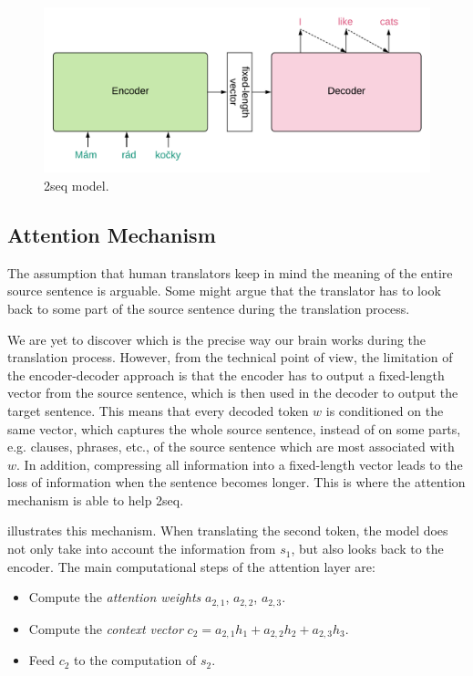 \begin{figure}
    \includegraphics[width=\linewidth]{img/seq2seq.pdf}
    \caption{\seq2seq model.}
    \label{fig:seq2seq}
\end{figure}

\subsection{Attention Mechanism}
\label{the-mt-att}
The assumption that human translators keep in mind the meaning of the entire source sentence is arguable.
Some might argue that the translator has to look back to some part of the source sentence during the translation process.

We are yet to discover which is the precise way our brain works during the translation process.
However, from the technical point of view, the limitation of the encoder-decoder approach is that the encoder has to output a fixed-length vector from the source sentence, which is then used in the decoder to output the target sentence.
This means that every decoded token $w$ is conditioned on the same vector, which captures the whole source sentence, instead of on some parts, e.g. clauses, phrases, etc., of the source sentence which are most associated with $w$.
In addition, compressing all information into a fixed-length vector leads to the loss of information when the sentence becomes longer.
This is where the attention mechanism is able to help \seq2seq.

 illustrates this mechanism. When translating the second token, the model does not only take into account the information from $s_1$, but also looks back to the encoder. The main computational steps of the attention layer are:
\begin{itemize}
    \item Compute the \textit{attention weights} $a_{2,1}$, $a_{2,2}$, $a_{2,3}$.
    \item Compute the \textit{context vector} $c_2 = a_{2,1}h_1 + a_{2,2}h_2 + a_{2,3}h_3$.
    \item Feed $c_2$ to the computation of $s_2$.
\end{itemize}

